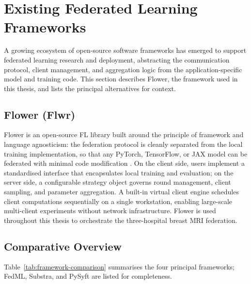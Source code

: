 \section{Existing Federated Learning Frameworks}
\label{sec:frameworks}

A growing ecosystem of open-source software frameworks has
emerged to support federated learning research and deployment,
abstracting the communication protocol, client management, and
aggregation logic from the application-specific model and
training code.
This section describes Flower, the framework used in this thesis, and lists the
principal alternatives for context.

\subsection{Flower (Flwr)}
\label{sec:flower}
\label{sec:fedml}
\label{sec:substra}
\label{sec:pysyft}

Flower is an open-source FL library built around the principle of framework
and language agnosticism: the federation protocol is cleanly separated from
the local training implementation, so that any PyTorch, TensorFlow, or JAX
model can be federated with minimal code modification
\cite{beutel2022flower}.
On the client side, users implement a standardised interface that
encapsulates local training and evaluation; on the server side, a
configurable strategy object governs round management, client sampling,
and parameter aggregation.
A built-in virtual client engine schedules client computations sequentially
on a single workstation, enabling large-scale multi-client experiments
without network infrastructure.
Flower is used throughout this thesis to orchestrate the three-hospital
breast MRI federation.

\subsection{Comparative Overview}
\label{sec:framework-comparison}

Table~\ref{tab:framework-comparison} summarises the four principal frameworks;
FedML, Substra, and PySyft are listed for completeness.

